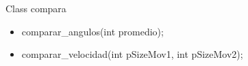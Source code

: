 \documentclass{beamer}
\begin{document}


\begin{frame}

Class compara
 
\begin{itemize}

\item comparar\_angulos(int promedio);
\item comparar\_velocidad(int pSizeMov1, int pSizeMov2);
\end{itemize}

\end{frame}

\end{document}
